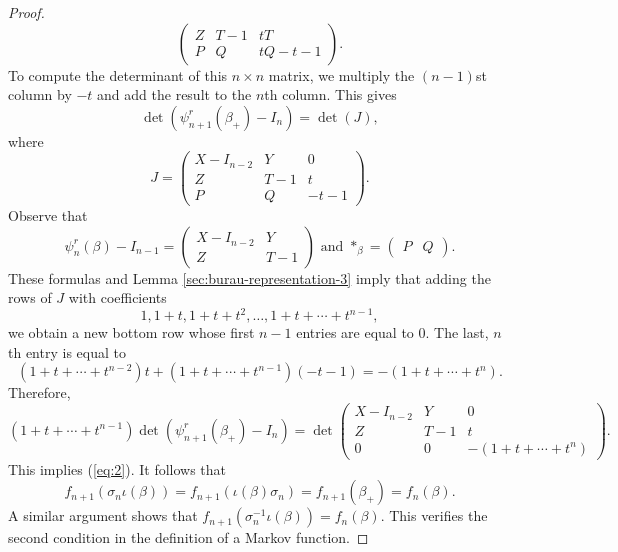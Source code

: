 \begin{proof}
\begin{displaymath}
\begin{pmatrix}
    Z & T-1 & tT \\
  P & Q & tQ - t- 1\end{pmatrix}.
\end{displaymath}
To compute the determinant of this $n\times n$ matrix, we multiply the $(n-1)$st column by $-t$ and add the result to the $n$th column. This gives 
\begin{displaymath}
\det(\psi_{n+1}^r(\beta_+) - I_n) = \det(J),
\end{displaymath}
where 
\begin{displaymath}
J = \begin{pmatrix} X-I_{n-2} & Y & 0 \\ Z & T-1 & t \\ P & Q & -t-1 \end{pmatrix}.
\end{displaymath}
Observe that 
\begin{displaymath}
\psi_n^r(\beta) - I_{n-1} = \begin{pmatrix} X-I_{n-2} & Y \\ Z & T-1 \end{pmatrix} \text{ and } *_{\beta} = \begin{pmatrix} P & Q \end{pmatrix}.
\end{displaymath}
These formulas and Lemma \ref{sec:burau-representation-3} imply that adding the rows of $J$ with coefficients 
\begin{displaymath}
1, 1+t, 1+t+t^2, \ldots, 1 + t + \cdots + t^{n-1},
\end{displaymath}
we obtain a new bottom row whose first $n-1$ entries are equal to $0$. The last, $n$th entry is equal to 
\begin{displaymath}
(1+t+\cdots + t^{n-2})t + (1+ t + \cdots + t^{n-1})(-t-1) = -(1 + t + \cdots + t^n).
\end{displaymath}
Therefore, 
\begin{displaymath}
(1+t+\cdots + t^{n-1})\det(\psi_{n+1}^r(\beta_+) - I_n) = \det \begin{pmatrix} X-I_{n-2} & Y & 0 \\ Z & T-1 & t \\ 0 & 0 & -(1 + t + \cdots + t^n) \end{pmatrix}.
\end{displaymath}
This implies (\ref{eq:2}). It follows that 
\begin{displaymath}
f_{n+1}(\sigma_n\iota(\beta)) = f_{n+1}(\iota(\beta) \sigma_n) = f_{n+1}(\beta_+) = f_n(\beta).
\end{displaymath}
A similar argument shows that $f_{n+1}(\sigma_n^{-1}\iota(\beta)) = f_n(\beta)$. This verifies the second condition in the definition of a Markov function.
\end{proof}

